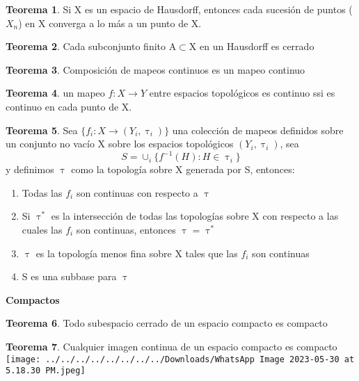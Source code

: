 \documentclass{article}
\theoremstyle{definition}
\newtheorem{theorem}{Teorema}[section]
\begin{document}
\begin{theorem}
	Si X es un espacio de Hausdorff, entonces cada sucesión de puntos ($X_n$) en X converga a lo más a un punto de X.
\end{theorem}


\begin{theorem}
	Cada subconjunto finito A$\subset$X en un Hausdorff es cerrado
\end{theorem}


\begin{theorem}
	Composición de mapeos continuos es un mapeo continuo
\end{theorem}


\begin{theorem}
	 un mapeo $f:X\to Y$ entre espacios topológicos es continuo ssi es continuo en cada punto de X.
\end{theorem}


\begin{theorem}
	Sea $\{f_i:X\to(Y_i,\uptau_i)\}$ una colección de mapeos definidos sobre un conjunto no vacío X sobre los espacios topológicos $(Y_i,\uptau_i)$, sea 
	\[S=\cup_i \{f^{-1}(H):H\in\uptau_i\}\]
	y definimos $\uptau$ como la topología sobre X generada por S, entonces:
	\begin{enumerate}
	\item Todas las $f_i$ son continuas con respecto a $\uptau$
	\item Si $\uptau^*$ es la intersección de todas las topologías sobre X con respecto a las cuales las $f_i$ son continuas, entonces $\uptau=\uptau^*$
	\item $\uptau$ es la topología menos fina sobre X tales que las $f_i$ son continuas
	\item S es una subbase para $\uptau$
	\end{enumerate}
\end{theorem}


\textbf{Compactos}

\begin{theorem}
	Todo subespacio cerrado de un espacio compacto es compacto
\end{theorem}


\begin{theorem}
	Cualquier imagen continua de un espacio compacto es compacto\\
	\texttt{[image: ../../../../../../../../Downloads/WhatsApp Image 2023-05-30 at 5.18.30 PM.jpeg]} 
\end{theorem}
\end{document}
